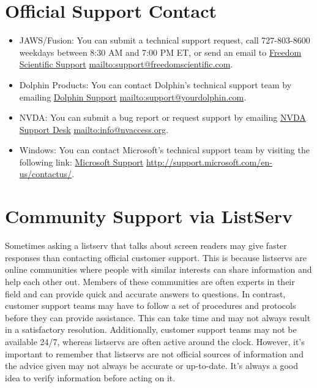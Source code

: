 \pagebreak \hypertarget{report}{}\section{Official Support Contact}\label{report}
\begin{itemize}[leftmargin=*]
\item JAWS/Fusion: You can submit a technical support request, call 727-803-8600 weekdays between 8:30 AM and 7:00 PM ET, or send an email to \href{mailto:support@freedomscientific.com}{Freedom Scientific Support} \url{mailto:support@freedomscientific.com}.
\item Dolphin Products: You can contact Dolphin’s technical support team by emailing \href{mailto:support@yourdolphin.com}{Dolphin Support} \url{mailto:support@yourdolphin.com}.
\item NVDA: You can submit a bug report or request support by emailing \href{mailto:info@nvaccess.org}{NVDA Support Desk} \url{mailto:info@nvaccess.org}.
\item Windows: You can contact Microsoft’s technical support team by visiting the following link: \href{http://support.microsoft.com/en-us/contactus/}{Microsoft Support} \url{http://support.microsoft.com/en-us/contactus/}.
\end{itemize}
\hypertarget{listserv}{}\section{Community Support via ListServ}\label{listserv}
Sometimes asking a listserv that talks about screen readers may give faster responses than contacting official customer support. This is because listservs are online communities where people with similar interests can share information and help each other out. Members of these communities are often experts in their field and can provide quick and accurate answers to questions. In contrast, customer support teams may have to follow a set of procedures and protocols before they can provide assistance. This can take time and may not always result in a satisfactory resolution. Additionally, customer support teams may not be available 24/7, whereas listservs are often active around the clock. However, it’s important to remember that listservs are not official sources of information and the advice given may not always be accurate or up-to-date. It’s always a good idea to verify information before acting on it.

